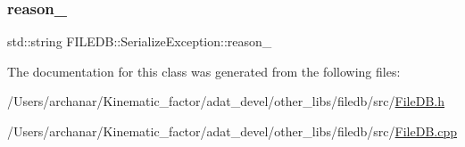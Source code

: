 \subsubsection{\texorpdfstring{reason\_}{reason\_}}
{\footnotesize\ttfamily std\+::string F\+I\+L\+E\+D\+B\+::\+Serialize\+Exception\+::reason\+\_\+\hspace{0.3cm}{\ttfamily [protected]}}



The documentation for this class was generated from the following files\+:\begin{DoxyCompactItemize}
\item 
/\+Users/archanar/\+Kinematic\+\_\+factor/adat\+\_\+devel/other\+\_\+libs/filedb/src/\mbox{\hyperlink{other__libs_2filedb_2src_2FileDB_8h}{File\+D\+B.\+h}}\item 
/\+Users/archanar/\+Kinematic\+\_\+factor/adat\+\_\+devel/other\+\_\+libs/filedb/src/\mbox{\hyperlink{FileDB_8cpp}{File\+D\+B.\+cpp}}\end{DoxyCompactItemize}
